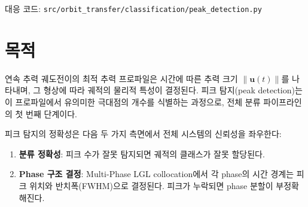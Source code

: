 \documentclass[11pt]{article}
\begin{document}
\drawborder
\thispagestyle{firstpage}

\def\lighterdate{February 15, 2026}

\begin{abstract}
본 보고서는 연속 추력 궤도전이 최적화 결과에서 추력 크기 프로파일 $\|\mathbf{u}(t)\|$의 피크를 자동으로 탐지하고 정량화하는 알고리즘의 수학적 배경과 구현 상세를 기술한다.
추력 프로파일의 피크 개수는 궤적 분류의 기초로, 피크가 1개면 unimodal (class~0), 2개면 bimodal (class~1), 3개 이상이면 multimodal (class~2)로 분류하며, 이 결과는 Multi-Phase collocation의 phase 구조 결정에 직접 사용된다.
본 구현은 \textbf{위상적 지속성(Topological Persistence)} 기반의 0차 persistent homology 알고리즘을 사용한다.
이 방법은 기존의 scipy \texttt{find\_peaks} 기반 접근법에 비해 (i)~파라미터가 하나뿐이며, (ii)~경계 피크를 별도 로직 없이 자연스럽게 처리하고, (iii)~보간 아티팩트에 강건하다는 장점이 있다.
\end{abstract}

\noindent 대응 코드: \texttt{src/orbit\_transfer/classification/peak\_detection.py}


\section{목적}

연속 추력 궤도전이의 최적 추력 프로파일은 시간에 따른 추력 크기 $\|\mathbf{u}(t)\|$를 나타내며, 그 형상에 따라 궤적의 물리적 특성이 결정된다.
피크 탐지(peak detection)는 이 프로파일에서 유의미한 극대점의 개수를 식별하는 과정으로, 전체 분류 파이프라인의 첫 번째 단계이다.

피크 탐지의 정확성은 다음 두 가지 측면에서 전체 시스템의 신뢰성을 좌우한다:
\begin{enumerate}[nosep]
\item \textbf{분류 정확성}: 피크 수가 잘못 탐지되면 궤적의 클래스가 잘못 할당된다.
\item \textbf{Phase 구조 결정}: Multi-Phase LGL collocation에서 각 phase의 시간 경계는 피크 위치와 반치폭(FWHM)으로 결정된다. 피크가 누락되면 phase 분할이 부정확해진다.
\end{enumerate}
\end{document}
